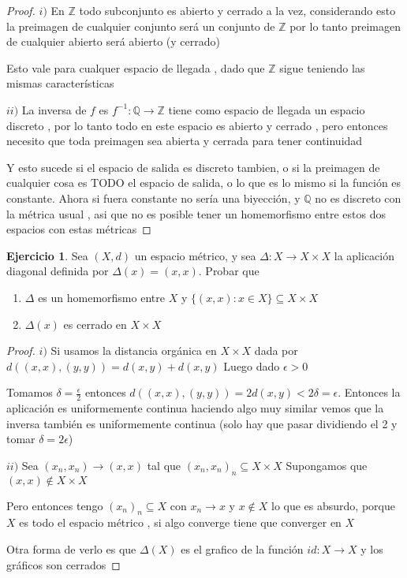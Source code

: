 \documentclass[12pt]{article}
\newcommand{\Q}{\mathbb{Q}}
\newcommand{\Z}{\mathbb{Z}}
\newcommand{\ra}{\rightarrow}
\theoremstyle{definition}
\newtheorem{ej}{Ejercicio}
\begin{document}
 \begin{proof}
 $i)$ En $\Z$ todo subconjunto es abierto y cerrado a la vez, considerando esto la preimagen de cualquier conjunto será un conjunto de $\Z$ por lo tanto preimagen de cualquier abierto será abierto (y cerrado)

   Esto vale para cualquer espacio de llegada , dado que $\Z$ sigue teniendo las mismas características 

 $ii)$ La inversa de $f$ es $f^{-1}: \Q \ra \Z$ tiene como espacio de llegada un espacio discreto , por lo tanto todo en este espacio es abierto y cerrado , pero entonces necesito que toda preimagen sea abierta y cerrada para tener continuidad

 Y esto sucede si el espacio de salida es discreto tambien, o si la preimagen de cualquier cosa es TODO el espacio de salida, o lo que es lo mismo si la función es constante. Ahora si fuera constante no sería una biyección, y $\Q$ no es discreto con la métrica usual , asi que no es posible tener un homemorfismo entre estos dos espacios con estas métricas
 \end{proof}
 \begin{ej}
   Sea $(X,d)$ un espacio métrico, y sea $\Delta : X \ra X \times X$ la aplicación diagonal definida por $\Delta (x) = (x,x)$. Probar que 
   \begin{enumerate}
     \item $\Delta$ es un homemorfismo entre $X$ y $\{(x,x) : x \in X \} \subseteq X \times X$
     \item $\Delta (x) $ es cerrado en $X \times X $
   \end{enumerate}
   \begin{proof}
   $i)$ Si usamos la distancia orgánica en $X \times X$ dada por $d((x,x),(y,y)) = d(x,y) + d(x,y)$ Luego dado $\epsilon >0$

   Tomamos $\delta = \frac{\epsilon}{2}$ entonces $d((x,x),(y,y)) = 2d(x,y) < 2\delta = \epsilon$. Entonces la aplicación es uniformemente continua haciendo algo muy similar vemos que la inversa también es uniformemente continua (solo hay que pasar dividiendo el 2 y tomar $\delta = 2\epsilon$)

 $ii)$ Sea $(x_n,x_n) \ra (x,x)$ tal que $(x_n,x_n)_n \subseteq X \times X$ Supongamos que $(x,x) \notin X \times X$

 Pero entonces tengo $(x_n)_n \subseteq X$ con $x_n \ra x$ y $x \notin X$ lo que es absurdo, porque $X$ es todo el espacio métrico , si algo converge tiene que converger en $X$

 Otra forma de verlo es que $\Delta (X)$ es el grafico de la función $id : X \ra X$ y los gráficos son cerrados
   \end{proof}
 \end{ej}
\end{document}
